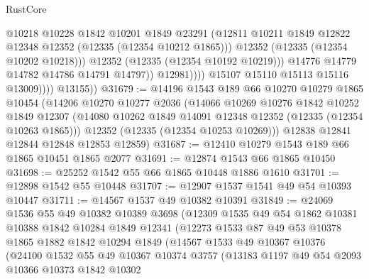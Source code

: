 \begin{lexlean}{RustCore}
\begin{coremodule}
                                @10218
                                @10228
                                @1842
                                @10201
                                @1849
                                @23291
                                (@12811
                                  @10211
                                  @1849
                                  @12822
                                  @12348
                                  @12352
                                  (@12335 (@12354 @10212 @1865)))
                                @12352
                                (@12335 (@12354 @10202 @10218)))
                              @12352
                              (@12335 (@12354 @10192 @10219)))
                            @14776
                            @14779
                            @14782
                            @14786
                            @14791
                            @14797))
                        @12981))))
                @15107
                @15110
                @15113
                @15116
                @13009))))
        @13155))
@31679 := @14196
    @1543
    @189
    @66
    @10270
    @10279
    @1865
    @10454
    (@14206
      @10270
      @10277
      @2036
      (@14066
        @10269
        @10276
        @1842
        @10252
        @1849
        @12307
        (@14080 @10262 @1849 @14091 @12348 @12352 (@12335 (@12354 @10263 @1865)))
        @12352
        (@12335 (@12354 @10253 @10269)))
      @12838
      @12841
      @12844
      @12848
      @12853
      @12859)
@31687 := @12410 @10279 @1543 @189 @66 @1865 @10451 @1865 @2077
@31691 := @12874 @1543 @66 @1865 @10450
@31698 := @25252 @1542 @55 @66 @1865 @10448 @1886 @1610
@31701 := @12898 @1542 @55 @10448
@31707 := @12907 @1537 @1541 @49 @54 @10393 @10447
@31711 := @14567 @1537 @49 @10382 @10391
@31849 := @24069
    @1536
    @55
    @49
    @10382
    @10389
    @3698
    (@12309
      @1535
      @49
      @54
      @1862
      @10381
      @10388
      @1842
      @10284
      @1849
      @12341
      (@12273
        @1533
        @87
        @49
        @53
        @10378
        @1865
        @1882
        @1842
        @10294
        @1849
        (@14567
          @1533
          @49
          @10367
          @10376
          (@24100
            @1532
            @55
            @49
            @10367
            @10374
            @3757
            (@13183
              @1197
              @49
              @54
              @2093
              @10366
              @10373
              @1842
              @10302

\end{coremodule}
\end{lexlean}
